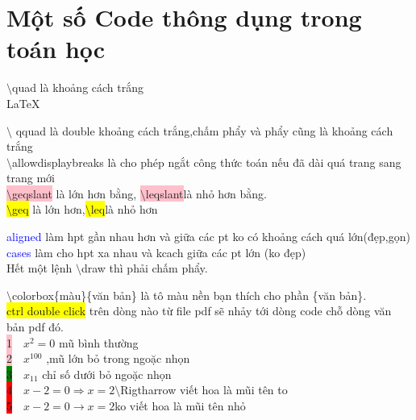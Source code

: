 \documentclass{article}
\begin{document}
\Large\section*{Một số Code thông dụng trong toán học}
\large $\setminus$quad là khoảng cách trắng\\

\LaTeX\

$\setminus$ qquad là double khoảng cách trắng,chấm phẩy và phẩy cũng là khoảng cách trắng\\

$\setminus$allowdisplaybreaks là cho phép ngắt công thức toán nếu đã dài quá trang sang trang mới\\

\colorbox{pink}{$\setminus$geqslant} là lớn hơn bằng, \colorbox{pink}{$\setminus$leqslant}là nhỏ hơn bằng.\\

\colorbox{yellow}{$\setminus$geq} là lớn hơn,\colorbox{yellow}{$\setminus$leq}là nhỏ hơn

\textcolor{blue}{aligned} làm hpt gần nhau hơn và giữa các pt ko có khoảng cách quá lớn(đẹp,gọn)\\

\textcolor{blue}{cases} làm cho hpt xa nhau và kcach giữa các pt lớn (ko đẹp)\\

Hết một lệnh $\setminus$draw thì phải chấm phẩy.

$\setminus$colorbox\{màu\}\{văn bản\} là tô màu nền bạn thích cho phần \{văn bản\}.\\

\colorbox{yellow}{ctrl double click} trên dòng nào từ file pdf sẽ nhảy tới dòng code chỗ dòng văn bản pdf đó.\\

\colorbox{pink}{1}$\quad x^2=0$  \quad     mũ bình thường \\

\colorbox{pink}{2}$\quad x^{100}$ \quad ,mũ lớn bỏ trong ngoặc nhọn\\

\colorbox{green}{3}$\quad x_{11}$ \quad chỉ số dưới bỏ ngoặc nhọn\\

\colorbox{red}{4}$\quad  x-2=0 \Rightarrow x=2 $\quad  $\setminus$Rigtharrow viết hoa là mũi tên to\\

\colorbox{red}{5}$\quad x-2=0 \rightarrow x=2  $\quad  ko viết hoa là mũi tên nhỏ\\
\end{document}
